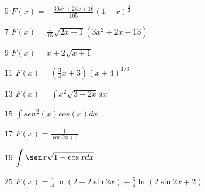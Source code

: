 \begin{multicols}{2}
\begin{enumerate}

\item[5]  $F(x)=-\frac{ 30x^{2}+24x+16 }{105}\left(
1-x\right) ^{\frac{3}{2}} $ 


\item[7] $F(x)=\frac{1}{15}\sqrt{2x-1}\left( 3x^{2}+2x-13\right) $


\item[9]  $F(x)=x+2\sqrt{x+1}$ 


\item[11] $F(x)=\left( \frac{3}{4} x+3 \right) (x+4)^{1/3}$


\item[13] $F(x)=\displaystyle\int x^{2}\sqrt{3-2x}dx$



\item[15] $\displaystyle\int sen^{2}(x)cos(x)dx$ 



\item[17] $F(x)=\frac{1}{\cos 2x+1}$


\item[19]  $\displaystyle\int\sen x\sqrt{1-\cos xdx}$ 




\item[25] $F(x)=\frac{1}{4}\ln
\left( 2-2\sin 2x\right) +\frac{5}{4}\ln \left( 2\sin 2x+2\right) $  


\end{enumerate}
\end{multicols}
